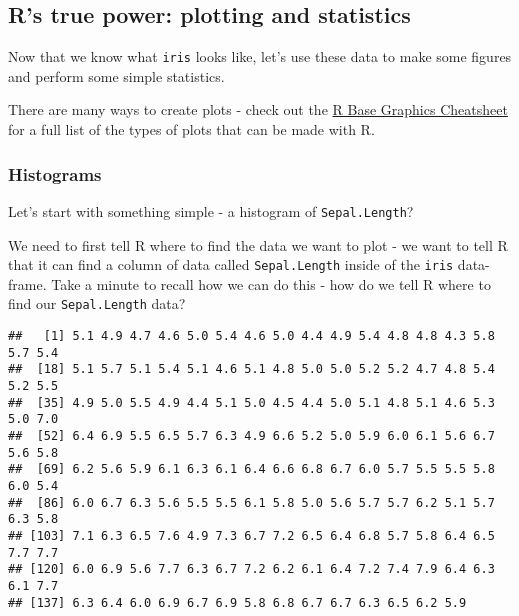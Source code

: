 \documentclass[]{article}
\newenvironment{Shaded}{\begin{snugshade}}{\end{snugshade}}
\newcommand{\CommentTok}[1]{\textcolor[rgb]{0.56,0.35,0.01}{\textit{#1}}}
\newcommand{\OperatorTok}[1]{\textcolor[rgb]{0.81,0.36,0.00}{\textbf{#1}}}
\newcommand{\NormalTok}[1]{#1}
\begin{document}
\subsection{R's true power: plotting and
statistics}\label{rs-true-power-plotting-and-statistics}

Now that we know what \texttt{iris} looks like, let's use these data to
make some figures and perform some simple statistics.

There are many ways to create plots - check out the
\href{http://publish.illinois.edu/johnrgallagher/files/2015/10/BaseGraphicsCheatsheet.pdf}{R
Base Graphics Cheatsheet} for a full list of the types of plots that can
be made with R.

\subsubsection{Histograms}\label{histograms}

Let's start with something simple - a histogram of
\texttt{Sepal.Length}?

We need to first tell R where to find the data we want to plot - we want
to tell R that it can find a column of data called \texttt{Sepal.Length}
inside of the \texttt{iris} data-frame. Take a minute to recall how we
can do this - how do we tell R where to find our \texttt{Sepal.Length}
data?

\begin{Shaded}
\end{Shaded}

\begin{verbatim}
##   [1] 5.1 4.9 4.7 4.6 5.0 5.4 4.6 5.0 4.4 4.9 5.4 4.8 4.8 4.3 5.8 5.7 5.4
##  [18] 5.1 5.7 5.1 5.4 5.1 4.6 5.1 4.8 5.0 5.0 5.2 5.2 4.7 4.8 5.4 5.2 5.5
##  [35] 4.9 5.0 5.5 4.9 4.4 5.1 5.0 4.5 4.4 5.0 5.1 4.8 5.1 4.6 5.3 5.0 7.0
##  [52] 6.4 6.9 5.5 6.5 5.7 6.3 4.9 6.6 5.2 5.0 5.9 6.0 6.1 5.6 6.7 5.6 5.8
##  [69] 6.2 5.6 5.9 6.1 6.3 6.1 6.4 6.6 6.8 6.7 6.0 5.7 5.5 5.5 5.8 6.0 5.4
##  [86] 6.0 6.7 6.3 5.6 5.5 5.5 6.1 5.8 5.0 5.6 5.7 5.7 6.2 5.1 5.7 6.3 5.8
## [103] 7.1 6.3 6.5 7.6 4.9 7.3 6.7 7.2 6.5 6.4 6.8 5.7 5.8 6.4 6.5 7.7 7.7
## [120] 6.0 6.9 5.6 7.7 6.3 6.7 7.2 6.2 6.1 6.4 7.2 7.4 7.9 6.4 6.3 6.1 7.7
## [137] 6.3 6.4 6.0 6.9 6.7 6.9 5.8 6.8 6.7 6.7 6.3 6.5 6.2 5.9
\end{verbatim}
\end{document}
